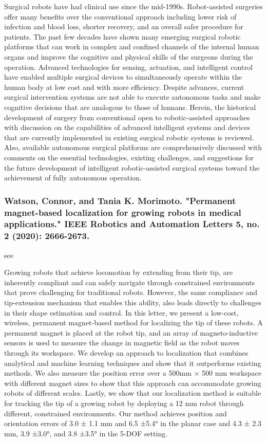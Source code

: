 \documentclass[conference]{IEEEtran}
\begin{document}
Surgical robots have had clinical use since the mid-1990s. Robot-assisted surgeries offer many benefits over the conventional approach including lower risk of infection and blood loss, shorter recovery, and an overall safer procedure for patients. The past few decades have shown many emerging surgical robotic platforms that can work in complex and confined channels of the internal human organs and improve the cognitive and physical skills of the surgeons during the operation. Advanced technologies for sensing, actuation, and intelligent control have enabled multiple surgical devices to simultaneously operate within the human body at low cost and with more efficiency. Despite advances, current surgical intervention systems are not able to execute autonomous tasks and make cognitive decisions that are analogous to those of humans. Herein, the historical development of surgery from conventional open to robotic-assisted approaches with discussion on the capabilities of advanced intelligent systems and devices that are currently implemented in existing surgical robotic systems is reviewed. Also, available autonomous surgical platforms are comprehensively discussed with comments on the essential technologies, existing challenges, and suggestions for the future development of intelligent robotic-assisted surgical systems toward the achievement of fully autonomous operation.

\medskip
\subsubsection{Watson, Connor, and Tania K. Morimoto. "Permanent magnet-based localization for growing robots in medical applications." IEEE Robotics and Automation Letters 5, no. 2 (2020): 2666-2673.}
see \cite{watson2020permanent}

Growing robots that achieve locomotion by extending from their tip, are inherently compliant and can safely navigate through constrained environments that prove challenging for traditional robots. However, the same compliance and tip-extension mechanism that enables this ability, also leads directly to challenges in their shape estimation and control. In this letter, we present a low-cost, wireless, permanent magnet-based method for localizing the tip of these robots. A permanent magnet is placed at the robot tip, and an array of magneto-inductive sensors is used to measure the change in magnetic field as the robot moves through its workspace. We develop an approach to localization that combines analytical and machine learning techniques and show that it outperforms existing methods. We also measure the position error over a 500mm × 500 mm workspace with different magnet sizes to show that this approach can accommodate growing robots of different scales. Lastly, we show that our localization method is suitable for tracking the tip of a growing robot by deploying a 12 mm robot through different, constrained environments. Our method achieves position and orientation errors of 3.0 ± 1.1 mm and 6.5 ±5.4° in the planar case and 4.3 ± 2.3 mm, 3.9 ±3.0°, and 3.8 ±3.5° in the 5-DOF setting.
\end{document}
